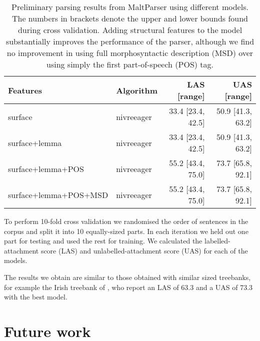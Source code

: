 \documentclass[a4paper,11pt, onecolumn,twoside]{article}
\begin{document}

\begin{table}[htbp]
	\caption{Preliminary parsing results from MaltParser using different models. The numbers in brackets denote the upper and lower bounds found during cross validation. Adding structural features to the model substantially improves the performance of the parser, although we find no improvement in using full morphosyntactic description (MSD) over using simply the first part-of-speech (POS) tag.}
	\centering
	\begin{tabular}{llrr}
		\toprule
			\textbf{Features}       & \textbf{Algorithm} &\textbf{LAS} [range] & \textbf{UAS} [range] \\
		\midrule
			surface                & nivreeager  & 33.4 [23.4, 42.5] & 50.9 [41.3, 63.2] \\
			surface+lemma          & nivreeager  & 33.4 [23.4, 42.5] & 50.9 [41.3, 63.2] \\
			surface+lemma+POS      & nivreeager  & 55.2 [43.4, 75.0] & 73.7 [65.8, 92.1] \\
			surface+lemma+POS+MSD  & nivreeager  & 55.2 [43.4, 75.0] & 73.7 [65.8, 92.1] \\
		\bottomrule
	\end{tabular}
	\label{table:eval}
\end{table}

To perform 10-fold cross validation we randomised the order of sentences in the corpus
and split it into 10 equally-sized parts. In each iteration we held out one part for testing and used
the rest for training. We calculated the labelled-attachment score (LAS) and 
unlabelled-attachment score (UAS) for each of the models.

The results we obtain are similar to those obtained with similar 
sized treebanks, for example the Irish treebank of \textcite{Lynn12}, who report an LAS of
63.3 and a UAS of 73.3 with the best model.


\section{Future work}\label{sec:future}



\end{document}
